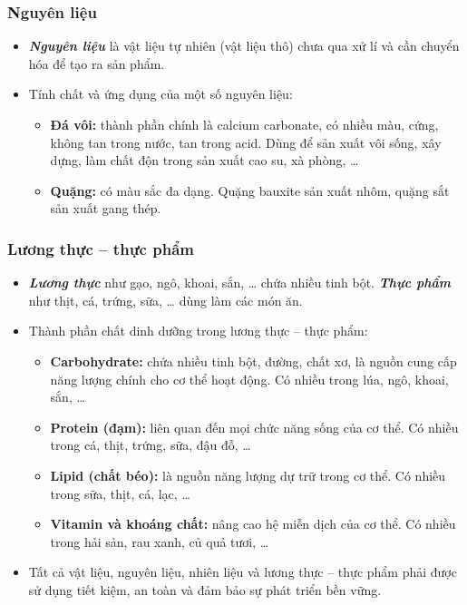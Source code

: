 \documentclass[Main.tex]{subfiles}
\begin{document}
\begin{kienthuccannho}
	\subsubsection{Nguyên liệu}
	\begin{itemize}
		\item \textbf{\textit{Nguyên liệu}} là vật liệu tự nhiên (vật liệu thô) chưa qua xử lí và cần chuyển hóa để tạo ra sản phẩm.
		\item Tính chất và ứng dụng của một số nguyên liệu:
		\begin{itemize}
			\item \textbf{Đá vôi:} thành phần chính là calcium carbonate, có nhiều màu, cứng, không tan trong nước, tan trong acid. Dùng để sản xuất vôi sống, xây dựng, làm chất độn trong sản xuất cao su, xà phòng, …
			\item \textbf{Quặng:} có màu sắc đa dạng. Quặng bauxite sản xuất nhôm, quặng sắt sản xuất gang thép.
		\end{itemize}
	\end{itemize}
	\subsubsection{Lương thực – thực phẩm}
	\begin{itemize}
		\item \textbf{\textit{Lương thực}} như gạo, ngô, khoai, sắn, … chứa nhiều tinh bột. \textbf{\textit{Thực phẩm}} như thịt, cá, trứng, sữa, … dùng làm các món ăn.
		\item Thành phần chất dinh dưỡng trong lương thực -- thực phẩm:
		\begin{itemize}
			\item \textbf{Carbohydrate:} chứa nhiều tinh bột, đường, chất xơ, là nguồn cung cấp năng lượng chính cho cơ thể hoạt động. Có nhiều trong lúa, ngô, khoai, sắn, …
			\item \textbf{Protein (đạm):} liên quan đến mọi chức năng sống của cơ thể. Có nhiều trong cá, thịt, trứng, sữa, đậu đỗ, …
			\item \textbf{Lipid (chất béo):} là nguồn năng lượng dự trữ trong cơ thể. Có nhiều trong sữa, thịt, cá, lạc, …
			\item \textbf{Vitamin và khoáng chất:} nâng cao hệ miễn dịch của cơ thể. Có nhiều trong hải sản, rau xanh, củ quả tươi, …
		\end{itemize}
		\item Tất cả vật liệu, nguyên liệu, nhiên liệu và lương thực -- thực phẩm phải được sử dụng tiết kiệm, an toàn và đảm bảo sự phát triển bền vững.
	\end{itemize}
\end{kienthuccannho}
\end{document}
